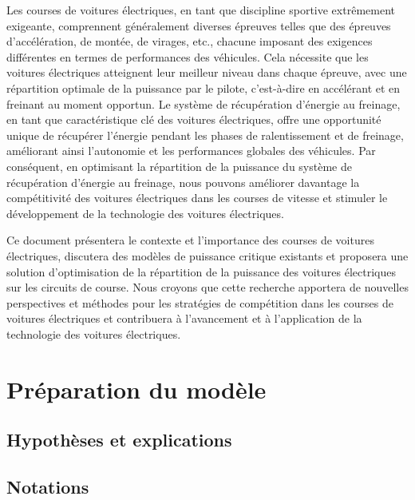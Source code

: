 \documentclass[lettersize,journal]{IEEEtran}
\begin{document}
Les courses de voitures électriques, en tant que discipline sportive extrêmement exigeante, comprennent généralement diverses épreuves telles que des épreuves d'accélération, de montée, de virages, etc., chacune imposant des exigences différentes en termes de performances des véhicules. Cela nécessite que les voitures électriques atteignent leur meilleur niveau dans chaque épreuve, avec une répartition optimale de la puissance par le pilote, c'est-à-dire en accélérant et en freinant au moment opportun.
Le système de récupération d'énergie au freinage, en tant que caractéristique clé des voitures électriques, offre une opportunité unique de récupérer l'énergie pendant les phases de ralentissement et de freinage, améliorant ainsi l'autonomie et les performances globales des véhicules. Par conséquent, en optimisant la répartition de la puissance du système de récupération d'énergie au freinage, nous pouvons améliorer davantage la compétitivité des voitures électriques dans les courses de vitesse et stimuler le développement de la technologie des voitures électriques.\par
Ce document présentera le contexte et l'importance des courses de voitures électriques, discutera des modèles de puissance critique existants et proposera une solution d'optimisation de la répartition de la puissance des voitures électriques sur les circuits de course. Nous croyons que cette recherche apportera de nouvelles perspectives et méthodes pour les stratégies de compétition dans les courses de voitures électriques et contribuera à l'avancement et à l'application de la technologie des voitures électriques.


\section{Préparation du modèle}
\subsection{Hypothèses et explications}

\subsection{Notations}
\end{document}
